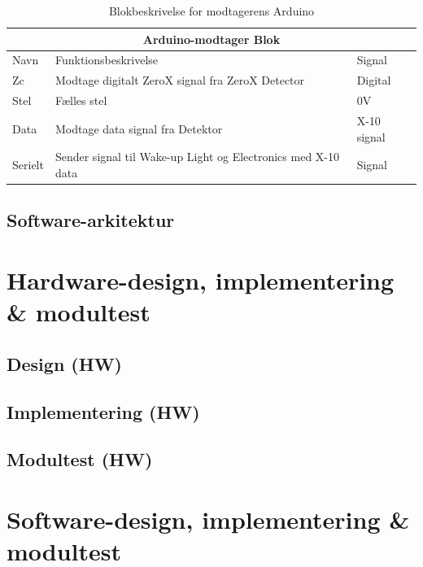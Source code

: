 \documentclass[11pt]{article}
\begin{document}
\begin{table}[H]
\centering
	\begin{tabular}{l|l|l}
	
	\toprule[0.4mm]\midrule \multicolumn{3}{c}{\textbf{Arduino-modtager Blok}}\\
	\midrule[0.4mm] Navn & Funktionsbeskrivelse & Signal\\ \midrule[0.3mm]
	 Zc & Modtage digitalt ZeroX signal fra ZeroX Detector & Digital\\
	 Stel & Fælles stel  & 0V\\
	 Data & Modtage data signal fra Detektor & X-10 signal\\
	 Serielt & Sender signal til Wake-up Light og Electronics med X-10 data & Signal\\
	 \midrule\bottomrule[0.4mm]

	\end{tabular}
	\caption{Blokbeskrivelse for modtagerens Arduino}
	\label{tab: Bloktabel Arduino modtager}
\end{table}
\qquad


\subsection{Software-arkitektur}

\vfill
\pagebreak

\section{Hardware-design, implementering \& modultest}
\subsection{Design (HW)}
\subsection{Implementering (HW)}
\subsection{Modultest (HW)}
\vfill
\pagebreak

\section{Software-design, implementering \& modultest}
\end{document}

